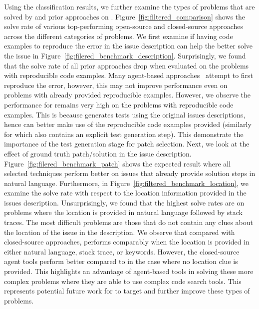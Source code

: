 Using the classification results, we further examine the types of problems that are solved by \tech and prior approaches on \swebenchlitefiltered. 
Figure~\ref{fig:filtered_comparison} shows the solve rate of various top-performing open-source and closed-source approaches across the different categories of problems. 
We first examine if having code examples to reproduce the error in the issue description can help the \llm better solve the issue in Figure~\ref{fig:filered_benchmark_description}.
Surprisingly, we found that the solve rate of all prior approaches drop when evaluated on the problems with reproducible code examples.
Many agent-based approaches~\cite{sweagent, opendevin, coder} attempt to first reproduce the error, however, this may not improve performance even on problems with already provided reproducible examples. 
However, we observe the performance for \tech remains very high on the problems with reproducible code examples. 
This is because \tech generates \reproduction tests using the original issues descriptions, hence can better make use of the reproducible code examples provided (similarly for \mentatbot{} which also contains an explicit test generation step).
This demonstrate the importance of the test generation stage for patch selection.
Next, we look at the effect of ground truth patch/solution in the issue description. 
Figure~\ref{fig:filered_benchmark_patch} shows the expected result where all selected techniques perform better on issues that already provide solution steps in natural language. 
Furthermore, in Figure~\ref{fig:filtered_benchmark_location}, we examine the solve rate with respect to the location information provided in the issues description.
Unsurprisingly, we found that the highest solve rates are on problems where the location is provided in natural language followed by stack traces. 
The most difficult problems are those that do not contain any clues about the location of the issue in the description.
We observe that compared with closed-source approaches, \tech performs comparably when the location is provided in either natural language, stack trace, or keywords. 
However, the closed-source agent tools perform better compared to \tech in the case where no location clue is provided.
This highlights an advantage of agent-based tools in solving these more complex problems where they are able to use complex code search tools. 
This represents potential future work for \tech to target and further improve these types of problems. 


















